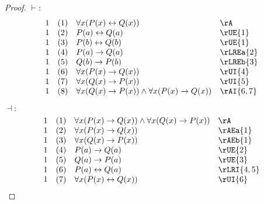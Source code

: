 \documentclass{book}
\theoremstyle{plain}
\theoremstyle{remark}
\theoremstyle{definition}
\begin{document}
\begin{proof}
	\(\vdash:\)
	\[
	\begin{array}{llll}
		1 & (1) & \forall x (P(x) \leftrightarrow Q(x)) & \rA \\
		1 & (2) & P(a) \leftrightarrow Q(a) & \rUE{1} \\
		1 & (3) & P(b) \leftrightarrow Q(b) & \rUE{1} \\
		1 & (4) & P(a) \rightarrow Q(a) & \rLREa{2} \\
		1 & (5) & Q(b) \rightarrow P(b) & \rLREb{3} \\
		1 & (6) & \forall x (P(x) \rightarrow Q(x)) & \rUI{4} \\
		1 & (7) & \forall x (Q(x) \rightarrow P(x)) & \rUI{5} \\
		1 & (8) & \forall x (Q(x) \rightarrow P(x))\wedge \forall x (P(x) \rightarrow Q(x))  & \rAI{6,7} \\
	\end{array}
	\]
	
	\(\dashv:\)
	\[
	\begin{array}{llll}
		1 & (1) & \forall x (P(x) \rightarrow Q(x)) \wedge \forall x (Q(x) \rightarrow P(x)) & \rA \\
		1 & (2) & \forall x (P(x) \rightarrow Q(x)) & \rAEa{1} \\
		1 & (3) & \forall x (Q(x) \rightarrow P(x)) & \rAEb{1} \\
		1 & (4) & P(a) \rightarrow Q(a) & \rUE{2} \\
		1 & (5) & Q(a) \rightarrow P(a) & \rUE{3} \\
		1 & (6) & P(a) \leftrightarrow Q(a) & \rLRI{4,5} \\
		1 & (7) & \forall x (P(x) \leftrightarrow Q(x)) & \rUI{6} \\
	\end{array}
	\]
\end{proof}
\end{document}
